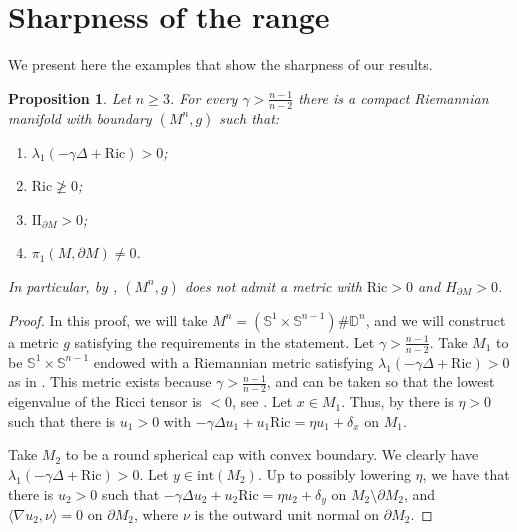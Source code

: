 \documentclass[12pt,a4paper,reqno]{amsart}
\newtheorem{proposition}{Proposition}
\theoremstyle{definition}
\renewcommand{\geq}{\geqslant}
\begin{document}
{\section{Sharpness of the range}\label{sec:Sharp}
We present here the examples that show the sharpness of our results.
\begin{proposition}\label{mainthmsharp}
     Let $n\geq 3$. For every $\gamma>\frac{n-1}{n-2}$ there is a compact Riemannian manifold with boundary $(M^n,g)$ such that:
     \begin{enumerate}
         \item $\lambda_1(-\gamma\Delta+\mathrm{Ric})> 0$;
         \item $\mathrm{Ric}\not\geq 0$;
         \item $\mathrm{II}_{\partial M}> 0$;
         \item $\pi_1(M,\partial M)\neq 0$.
     \end{enumerate}
     In particular, by \cite[Proposition 2.8]{FraserLi}, $(M^n,g)$ does not admit a metric with $\mathrm{Ric}>0$ and $H_{\partial M}>0$.
    \end{proposition}
        \begin{proof}
        In this proof, we will take $M^n=(\mathbb S^1\times \mathbb S^{n-1})\# \mathbb D^n$, and we will construct a metric $g$ satisfying the requirements in the statement. Let $\gamma>\frac{n-1}{n-2}$. Take $M_1$ to be $\mathbb S^1\times \mathbb S^{n-1}$ endowed with a Riemannian metric satisfying $\lambda_1(-\gamma\Delta+\mathrm{Ric})>0$ as in \cite[Remark 4]{AX24}. This metric exists because $\gamma>\frac{n-1}{n-2}$, and can be taken so that the lowest eigenvalue of the Ricci tensor is $<0$, see \cite[Remark 4]{AX24}. Let $x\in M_1$. Thus, by \cite[Theorem 2.3]{CatinoMariMastroliaRoncoroni} there is $\eta>0$ such that there is $u_1>0$ with $-\gamma\Delta u_1 +u_1\mathrm{Ric}=\eta u_1 +\delta_x$ on $M_1$.
        
        Take $M_2$ to be a round spherical cap with convex boundary. We clearly have $\lambda_1(-\gamma\Delta+\mathrm{Ric})>0$. Let $y\in \mathrm{int}(M_2)$. Up to possibly lowering $\eta$, we have that there is $u_2>0$ such that $-\gamma\Delta u_2+u_2\mathrm{Ric}=\eta u_2+\delta_y$ on $M_2\setminus \partial M_2$, and $\langle \nabla u_2,\nu\rangle =0$ on $\partial M_2$, where $\nu$ is the outward unit normal on $\partial M_2$.
        

\end{proof}}
\end{document}
